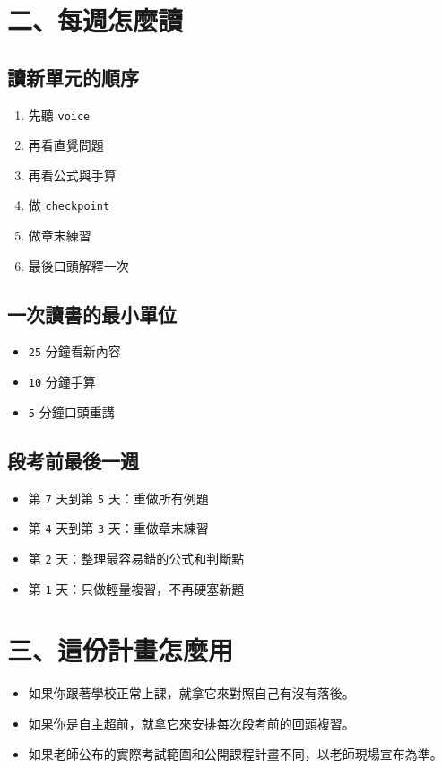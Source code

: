 \documentclass[
  chinese,
  12pt,
  a4paper,
  oneside]{article}
\providecommand{\tightlist}{%
  \setlength{\itemsep}{0pt}\setlength{\parskip}{0pt}}
\begin{document}
\section{二、每週怎麼讀}\label{ux4e8cux6bcfux9031ux600eux9ebcux8b80}

\subsection{讀新單元的順序}\label{ux8b80ux65b0ux55aeux5143ux7684ux9806ux5e8f}

\begin{enumerate}
\def\labelenumi{\arabic{enumi}.}
\tightlist
\item
  先聽 \texttt{voice}
\item
  再看直覺問題
\item
  再看公式與手算
\item
  做 \texttt{checkpoint}
\item
  做章末練習
\item
  最後口頭解釋一次
\end{enumerate}

\subsection{一次讀書的最小單位}\label{ux4e00ux6b21ux8b80ux66f8ux7684ux6700ux5c0fux55aeux4f4d}

\begin{itemize}
\tightlist
\item
  \texttt{25} 分鐘看新內容
\item
  \texttt{10} 分鐘手算
\item
  \texttt{5} 分鐘口頭重講
\end{itemize}

\subsection{段考前最後一週}\label{ux6bb5ux8003ux524dux6700ux5f8cux4e00ux9031}

\begin{itemize}
\tightlist
\item
  第 \texttt{7} 天到第 \texttt{5} 天：重做所有例題
\item
  第 \texttt{4} 天到第 \texttt{3} 天：重做章末練習
\item
  第 \texttt{2} 天：整理最容易錯的公式和判斷點
\item
  第 \texttt{1} 天：只做輕量複習，不再硬塞新題
\end{itemize}

\section{三、這份計畫怎麼用}\label{ux4e09ux9019ux4efdux8a08ux756bux600eux9ebcux7528}

\begin{itemize}
\tightlist
\item
  如果你跟著學校正常上課，就拿它來對照自己有沒有落後。
\item
  如果你是自主超前，就拿它來安排每次段考前的回頭複習。
\item
  如果老師公布的實際考試範圍和公開課程計畫不同，以老師現場宣布為準。
\end{itemize}
\end{document}
